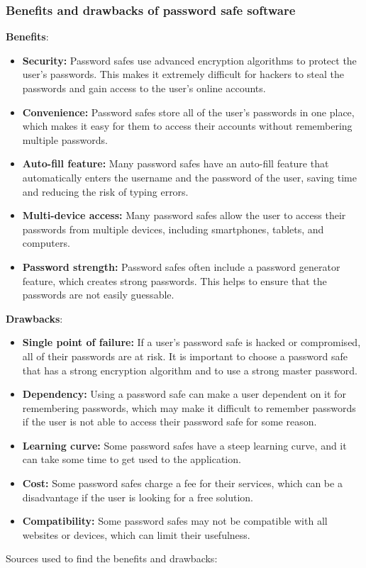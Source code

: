 \documentclass[conference]{IEEEtran}
\begin{document}
\subsubsection{Benefits and drawbacks of password safe software}
\textbf{Benefits}:
\begin{itemize}
    \item \textbf{Security:} Password safes use advanced encryption algorithms to protect the user's passwords. This makes it extremely difficult for hackers to steal the passwords and gain access to the user's online accounts.
    \item \textbf{Convenience:} Password safes store all of the user's passwords in one place, which makes it easy for them to access their accounts without remembering multiple passwords.
    \item \textbf{Auto-fill feature:} Many password safes have an auto-fill feature that automatically enters the username and the password of the user, saving time and reducing the risk of typing errors.
    \item \textbf{Multi-device access:} Many password safes allow the user to access their passwords from multiple devices, including smartphones, tablets, and computers.
    \item \textbf{Password strength:} Password safes often include a password generator feature, which creates strong passwords. This helps to ensure that the passwords are not easily guessable.
\end{itemize}
\textbf{Drawbacks}:
\begin{itemize}
    \item \textbf{Single point of failure:} If a user's password safe is hacked or compromised, all of their passwords are at risk. It is important to choose a password safe that has a strong encryption algorithm and to use a strong master password.
    \item \textbf{Dependency:} Using a password safe can make a user dependent on it for remembering passwords, which may make it difficult to remember passwords if the user is not able to access their password safe for some reason.
    \item \textbf{Learning curve:} Some password safes have a steep learning curve, and it can take some time to get used to the application.
    \item \textbf{Cost:} Some password safes charge a fee for their services, which can be a disadvantage if the user is looking for a free solution.
    \item \textbf{Compatibility:} Some password safes may not be compatible with all websites or devices, which can limit their usefulness.
\end{itemize}
Sources used to find the benefits and drawbacks: \cite{b8}
\end{document}
